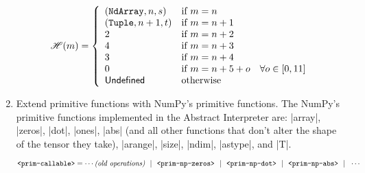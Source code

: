 \begin{enumerate}
  \[\mathscr{H}(m) = \left\{
    \begin{array}{ll}
      (\texttt{NdArray}, n, s) & \text{if } m = n \\
      (\texttt{Tuple}, n+1, t) & \text{if } m = n + 1 \\
      2 & \text{if } m = n + 2 \\
      4 & \text{if } m = n + 3 \\
      3 & \text{if } m = n + 4 \\
      0 & \text{if } m = n + 5 + o \quad \forall o \in [0, 11] \\
      \mathsf{Undefined} & \text{otherwise} \\
    \end{array}
  \right.\]


\item
  Extend primitive functions with NumPy's primitive functions. The
  NumPy's primitive functions implemented in the Abstract Interpreter
  are: \pycode|array|, \pycode|zeros|, \pycode|dot|, \pycode|ones|,
  \pycode|abs| (and all other functions that don't alter the shape of
  the tensor they take), \pycode|arange|, \pycode|size|, \pycode|ndim|,
  \pycode|astype|, and \pycode|T|.

  \vspace*{-1.3em}
  \[\texttt{<prim-callable>} = \cdots \textit{(old operations)} ~~|~~
                  \texttt{<prim-np-zeros>} ~~|~~ \texttt{<prim-np-dot>} ~~|~~
                  \texttt{<prim-np-abs>} ~~|~~ \cdots\]



\end{enumerate}
